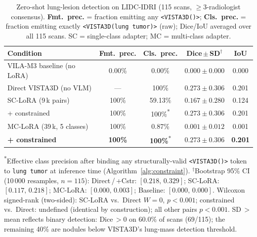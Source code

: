 \documentclass[lineno,referee,pdflatex,sn-mathphys-num]{sn-jnl}
\begin{document}
\begin{table}[!ht]
  \centering
  \caption{Zero-shot lung-lesion detection on LIDC-IDRI (115 scans,
    $\geq$3-radiologist consensus). \textbf{Fmt.\ prec.} = fraction
    emitting any \texttt{<VISTA3D(\textellipsis)>}; \textbf{Cls.\ prec.}
    = fraction emitting exactly \texttt{<VISTA3D(lung tumor)>} (raw);
    Dice/IoU averaged over all 115 scans. SC = single-class adapter;
    MC = multi-class adapter.}
  \label{tab:detection}
  \begin{tabular}{lcccc}
    \toprule
    Condition & Fmt.\ prec. & Cls.\ prec. & Dice\,$\pm$\,SD$^\dagger$ & IoU \\
    \midrule
    VILA-M3 baseline (no LoRA)  & 0.00\%  & 0.00\%   & $0.000\pm0.000$ & 0.000 \\
    Direct VISTA3D (no VLM)     & ---     & 100\%    & $0.273\pm0.306$ & 0.201 \\
    \midrule
    SC-LoRA (9\,k pairs)        & 100\%   & 59.13\%  & $0.167\pm0.280$ & 0.124 \\
    \quad{}+ constrained        & 100\%   & 100\%\textsuperscript{*}
                                                      & $0.273\pm0.306$ & 0.201 \\
    \midrule
    MC-LoRA (39\,k, 5 classes)  & 100\%   & 0.87\%   & $0.001\pm0.012$ & 0.001 \\
    \textbf{\quad{}+ constrained} & \textbf{100\%} & \textbf{100\%}\textsuperscript{*}
                                  & $\mathbf{0.273\pm0.306}$ & \textbf{0.201} \\
    \bottomrule
  \end{tabular}
  \par\smallskip
  {\footnotesize
    \textsuperscript{*}Effective class precision after binding any
    structurally-valid \texttt{<VISTA3D(\textellipsis)>} token to
    \texttt{lung tumor} at inference time (Algorithm~\ref{alg:constraint}).
    $^\dagger$Bootstrap 95\% CI (10\,000 resamples, $n=115$):
    Direct\,/\,+Cstr: $[0.218,\,0.329]$; SC-LoRA: $[0.117,\,0.218]$;
    MC-LoRA: $[0.000,\,0.003]$; Baseline: $[0.000,\,0.000]$.
    Wilcoxon signed-rank (two-sided): SC-LoRA vs.\ Direct $W\!=\!0$,
    $p<0.001$; constrained vs.\ Direct: undefined (identical by construction);
    all other pairs $p<0.001$.
    SD\,$>$\,mean reflects binary detection: Dice\,$>0$ on 60.0\% of scans
    (69/115); the remaining 40\% are nodules below VISTA3D's lung-mass
    detection threshold.}
\end{table}
\end{document}
